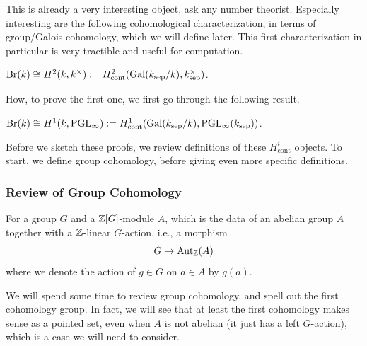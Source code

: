 \documentclass[12pt]{article}
\newcommand{\sep}{\text{sep}}
\newcommand{\Br}{\mathrm{Br}}
\newcommand{\Gal}{\mathrm{Gal}}
\newcommand{\PGL}{\mathrm{PGL}}
\begin{document}
This is already a very interesting object, ask any number theorist. Especially interesting are the following cohomological characterization, in terms of group/Galois cohomology, which we will define later. This first characterization in particular is very tractible and useful for computation.
\begin{thm}\label{H2-Galois-Cohomology}
    $\Br(k) \cong H^2(k,k^\times) \defeq H^2_{\text{cont}}(\Gal(k_{\sep}/k),k_{\sep}^\times)$.
\end{thm}

How, to prove the first one, we first go through the following result.
\begin{prop}
    $\Br(k) \cong H^1(k,\PGL_\infty) \defeq H^1_{\text{cont}}(\Gal(k_\sep/k),\PGL_\infty(k_\sep))$.
\end{prop}

Before we sketch these proofs, we review definitions of these $H^i_{\text{cont}}$ objects. To start, we define group cohomology, before giving even more specific definitions.

\subsubsection{Review of Group Cohomology}

For a group $G$ and a $\mathbb{Z}[G]$-module $A$, which is the data of an abelian group $A$ together with a $\mathbb{Z}$-linear $G$-action, i.e., a morphism
\[G\to \mathrm{Aut}_{\mathbb{Z}}(A)\]
where we denote the action of $g\in G$ on $a\in A$ by $g(a)$.

We will spend some time to review group cohomology, and spell out the first cohomology group. In fact, we will see that at least the first cohomology makes sense as a pointed set, even when $A$ is not abelian (it just has a left $G$-action), which is a case we will need to consider.
\end{document}
